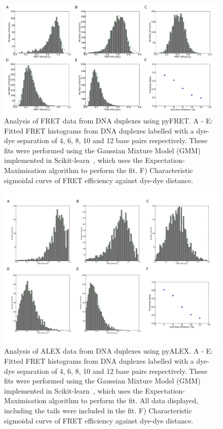\begin{figure}[!ht]
   \begin{center}
      \includegraphics*[clip=true, width=6.5in]{pyFRET/FRET_AND.pdf}
      \caption{Analysis of FRET data from DNA duplexes using pyFRET. A - E: Fitted FRET histograms from DNA duplexes labelled with a dye-dye separation of 4, 6, 8, 10 and 12 base pairs respectively. These fits were performed using the Gaussian Mixture Model (GMM) implemented in Scikit-learn~\cite{scikit-learn}, which uses the Expectation-Maximisation algorithm to perform the fit. F) Characteristic sigmoidal curve of FRET efficiency against dye-dye distance.}
      \label{fig:fig4_AND_plots}
   \end{center}
\end{figure}

\begin{figure}[!ht]
   \begin{center}
      \includegraphics*[clip=true, width=6.5in]{pyFRET/FRET_ALEX.pdf}
      \caption{Analysis of ALEX data from DNA duplexes using pyALEX. A - E: Fitted FRET histograms from DNA duplexes labelled with a dye-dye separation of 4, 6, 8, 10 and 12 base pairs respectively. These fits were performed using the Gaussian Mixture Model (GMM) implemented in Scikit-learn~\cite{scikit-learn}, which uses the Expectation-Maximisation algorithm to perform the fit. All data displayed, including the tails were included in the fit. F) Characteristic sigmoidal curve of FRET efficiency against dye-dye distance. }
      \label{fig:fig5_ALEX_plots}
   \end{center}
\end{figure}



